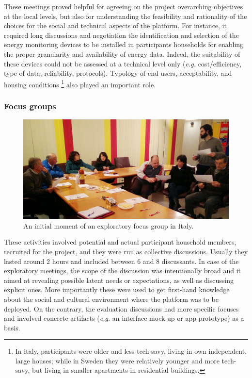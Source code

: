 These meetings proved helpful for agreeing on the project overarching objectives at the local levels, but also
for understanding the feasibility and rationality of the choices for the social and technical aspects of the platform.
For instance, it required long discussions and negotiation the identification and selection of the energy monitoring devices to be installed in
participants households for enabling the proper granularity and availability of energy data. Indeed,
the suitability of these devices could not be assessed at a technical level only (\textit{e.g.} cost/efficiency, type of data,
reliability, protocols). Typology of end-users, acceptability, and housing conditions \footnote{ In italy, participants were older and less tech-savy, living in own
independent, large houses; while in Sweden they were relatively younger and more tech-savy, but living in smaller apartments in residential buildings.}
also played an important role. 

%
%


\subsubsection{Focus groups} %

%
\begin{figure}[h!]
	\centering
	\includegraphics[width=.8\linewidth]{img/FocusGroup_TN.jpg}
	\caption{An initial moment of an exploratory focus group in Italy.}
	\label{fig:focusgroups}
\end{figure}


These activities involved potential and actual participant household members, recruited for the project, and they
were run as collective discussions. Usually they lasted around 2 hours and included between 6 and 8 discussants.
In case of the exploratory meetings, the scope of the discussion was intentionally broad and it aimed at revealing possible latent
needs or expectations, as well as discussing explicit ones. More importantly these were used to get first-hand knowledge
about the social and cultural environment where the platform was to be deployed. On the contrary, the evaluation discussions
had more specific focuses and involved concrete artifacts (\textit{e.g.} an interface mock-up or app prototype)
as a basis.

